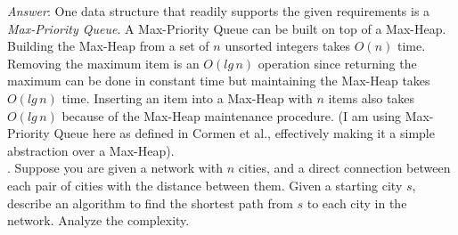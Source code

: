 \documentclass{scrartcl}
\begin{document}
    \noindent
    \textit{Answer}: One data structure that readily supports the given requirements is a
    \emph{Max-Priority Queue}. A Max-Priority Queue can be built on top of a Max-Heap. Building the
    Max-Heap from a set of $n$ unsorted integers takes $O(n)$ time. Removing the maximum item is an
    $O(lg\,n)$ operation since returning the maximum can be done in constant time but maintaining
    the Max-Heap takes $O(lg\,n)$ time. Inserting an item into a Max-Heap with $n$ items also takes
    $O(lg\,n)$ because of the Max-Heap maintenance procedure. (I am using Max-Priority Queue here as
    defined in Cormen et al., effectively making it a simple abstraction over a Max-Heap).\\

    \newpage
    . Suppose you are given a network with $n$ cities, and a direct connection between each pair of
    cities with the distance between them. Given a starting city $s$, describe an algorithm to find
    the shortest path from $s$ to each city in the network. Analyze the complexity.\\
\end{document}
